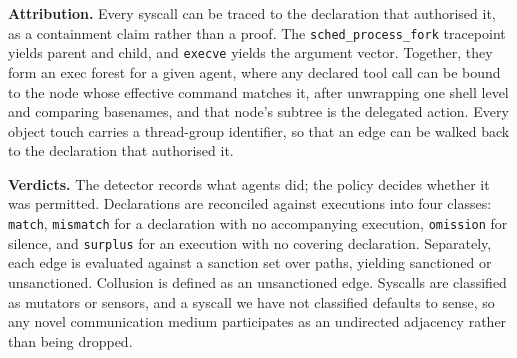\noindent\textbf{Attribution.} Every syscall can be traced to the declaration that authorised it, as a containment claim rather than a proof. The \texttt{sched\_process\_fork} tracepoint yields parent and child, and \texttt{execve} yields the argument vector. Together, they form an exec forest for a given agent, where any declared tool call can be bound to the node whose effective command matches it, after unwrapping one shell level and comparing basenames, and that node's subtree is the delegated action. Every object touch carries a thread-group identifier, so that an edge can be walked back to the declaration that authorised it.

\noindent\textbf{Verdicts.} The detector records what agents did; the policy decides whether it was permitted. Declarations are reconciled against executions into four classes: \texttt{match}, \texttt{mismatch} for a declaration with no accompanying execution, \texttt{omission} for silence, and \texttt{surplus} for an execution with no covering declaration. Separately, each edge is evaluated against a sanction set over paths, yielding sanctioned or unsanctioned. Collusion is defined as an unsanctioned edge. Syscalls are classified as mutators or sensors, and a syscall we have not classified defaults to sense, so any novel communication medium participates as an undirected adjacency rather than being dropped.

